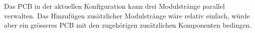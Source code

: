 {\begin{a3pages}
{\begin{minipage}{135mm}
        Das  PCB  in  der  aktuellen Konfiguration  kann  drei  Modulstr\"ange
        parallel  verwalten. Das  Hinzuf\"ugen  zus\"atzlicher  Modulstr\"ange
        w\"are  relativ einfach,  w\"urde  aber ein  gr\"osseres  PCB mit  den
        zugeh\"origen zus\"atzlichen Komponenten bedingen.

\end{minipage}}
\end{a3pages}}
